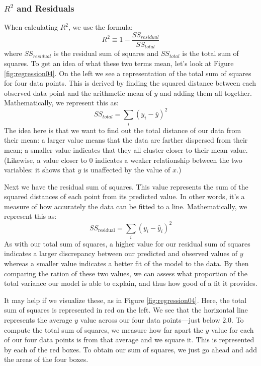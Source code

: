 \subsubsection{$R^2$ and Residuals}
When calculating $R^2$, we use the formula:
\begin{equation}
R^2 \equiv 1-\frac{SS_{residual}}{SS_{total}}
\end{equation}
where $SS_{residual}$ is the residual sum of squares and $SS_{total}$ is the total sum of squares. To get an idea of what these two terms mean, let's look at Figure \ref{fig:regression04}. On the left we see a representation of the total sum of squares for four data points. This is derived by finding the squared distance between each observed data point and the arithmetic mean of $y$ and adding them all together. Mathematically, we represent this as:
\begin{equation*}
SS_{total} =\sum_i \left(y_i-\bar{y}\right)^2
\end{equation*}
The idea here is that we want to find out the total distance of our data from their mean: a larger value means that the data are farther dispersed from their mean; a smaller value indicates that they all cluster closer to their mean value. (Likewise, a value closer to 0 indicates a weaker relationship between the two variables: it shows that $y$ is unaffected by the value of $x$.)

Next we have the residual sum of squares. This value represents the sum of the squared distances of each point from its predicted value. In other words, it's a measure of how accurately the data can be fitted to a line. Mathematically, we represent this as:
\begin{equation*}
SS_\text{residual}=\sum_i \left(y_i - \hat{y}_i\right)^2
\end{equation*}
As with our total sum of squares, a higher value for our residual sum of squares indicates a larger discrepancy between our predicted and observed values of $y$ whereas a smaller value indicates a better fit of the model to the data. By then comparing the ration of these two values, we can assess what proportion of the total variance our model is able to explain, and thus how good of a fit it provides.

It may help if we visualize these, as in Figure \ref{fig:regression04}. Here, the total sum of squares is represented in red on the left.  We see that the horizontal line represents the average $y$ value across our four data points---just below $2.0$. To compute the total sum of squares, we measure how far apart the $y$ value for each of our four data points is from that average and we square it. This is represented by each of the red boxes. To obtain our sum of squares, we just go ahead and add the areas of the four boxes.

